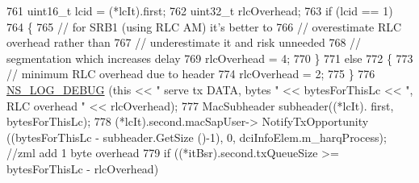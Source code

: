 \begin{DoxyCode}
761                                                                         uint16\_t lcid = (*lcIt).first;
762                                                                         uint32\_t rlcOverhead;
763                                                                         \textcolor{keywordflow}{if} (lcid == 1)
764                                                                         \{
765                                                                                 \textcolor{comment}{// for SRB1 (using RLC AM)
       it's better to}
766                                                                                 \textcolor{comment}{// overestimate RLC
       overhead rather than}
767                                                                                 \textcolor{comment}{// underestimate it and
       risk unneeded}
768                                                                                 \textcolor{comment}{// segmentation which
       increases delay}
769                                                                                 rlcOverhead = 4;
770                                                                         \}
771                                                                         \textcolor{keywordflow}{else}
772                                                                         \{
773                                                                                 \textcolor{comment}{// minimum RLC overhead due
       to header}
774                                                                                 rlcOverhead = 2;
775                                                                         \}
776                                                                         
      \hyperlink{group__logging_ga413f1886406d49f59a6a0a89b77b4d0a}{NS\_LOG\_DEBUG} (\textcolor{keyword}{this} << \textcolor{stringliteral}{" serve tx DATA, bytes "} << bytesForThisLc << \textcolor{stringliteral}{", RLC overhead "} << 
      rlcOverhead);
777                                                                         MacSubheader subheader((*lcIt).
      first, bytesForThisLc);
778                                                                         (*lcIt).second.macSapUser->
      NotifyTxOpportunity ((bytesForThisLc - subheader.GetSize ()-1), 0, dciInfoElem.m\_harqProcess); \textcolor{comment}{//zml add 1 byte
       overhead}
779                                                                         \textcolor{keywordflow}{if} ((*itBsr).second.txQueueSize >= 
      bytesForThisLc - rlcOverhead)

\end{DoxyCode}
